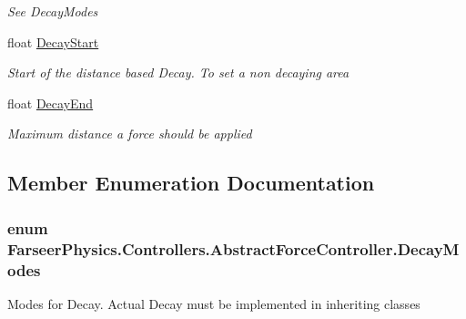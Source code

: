 \begin{DoxyCompactItemize}
\begin{DoxyCompactList}\small\item\em See Decay\+Modes \end{DoxyCompactList}\item 
float \hyperlink{class_farseer_physics_1_1_controllers_1_1_abstract_force_controller_a6f91b4521dd401ec975f8f5fa6c8f98c}{Decay\+Start}
\begin{DoxyCompactList}\small\item\em Start of the distance based Decay. To set a non decaying area \end{DoxyCompactList}\item 
float \hyperlink{class_farseer_physics_1_1_controllers_1_1_abstract_force_controller_ae217ee5b963ad0c5a6ccc4cbd6fe2423}{Decay\+End}
\begin{DoxyCompactList}\small\item\em Maximum distance a force should be applied \end{DoxyCompactList}\end{DoxyCompactItemize}


\subsection{Member Enumeration Documentation}
\hypertarget{class_farseer_physics_1_1_controllers_1_1_abstract_force_controller_aa49b5aa364a7f2f8a51af67437adabe0}{
\subsubsection[{Decay\+Modes}]{\setlength{\rightskip}{0pt plus 5cm}enum {\bf Farseer\+Physics.\+Controllers.\+Abstract\+Force\+Controller.\+Decay\+Modes}}}\label{class_farseer_physics_1_1_controllers_1_1_abstract_force_controller_aa49b5aa364a7f2f8a51af67437adabe0}


Modes for Decay. Actual Decay must be implemented in inheriting classes 

